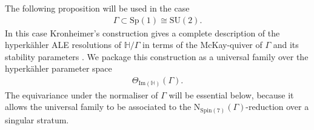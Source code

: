 \documentclass[psamsfonts]{amsart}
\theoremstyle{plain}
\theoremstyle{definition}{
\newtheorem{defi}{Definition}[section]
\newtheorem{ass}{Assumption}
\newtheorem*{nota}{Notation}}
\theoremstyle{remark}{
\newtheorem{rem}{Remark}
\newtheorem{ex}{Example}}
\theoremstyle{plain}{
\newtheorem{thm}{Theorem}[section]
\newtheorem{lem}{Lemma}[section]
\newtheorem{cor}{Corollary}[section]
\newtheorem{prop}{Proposition}[section]
\newtheorem{con}{Conjecture}[section]}
\newcommand{\m}[1]{{\mathrm{#1}}}
\begin{document}
The following proposition will be used in the case
\begin{align*}
\Gamma\subset \m{Sp}(1)\cong \m{SU}(2).
\end{align*}
In this case Kronheimer's construction gives a complete description of the hyperkähler ALE resolutions of $\mathbb{H}/\Gamma$ in terms of the McKay-quiver of $\Gamma$ and its stability parameters \cite{kronheimer1989construction,kronheimer}. We package this construction as a universal family over the hyperkähler parameter space
\begin{align*}
\Theta_{\m{Im}(\mathbb{H})}(\Gamma).
\end{align*}
The equivariance under the normaliser of $\Gamma$ will be essential below, because it allows the universal family to be associated to the $\m{N}_{\m{Spin}(7)}(\Gamma)$-reduction over a singular stratum.\\
\end{document}
